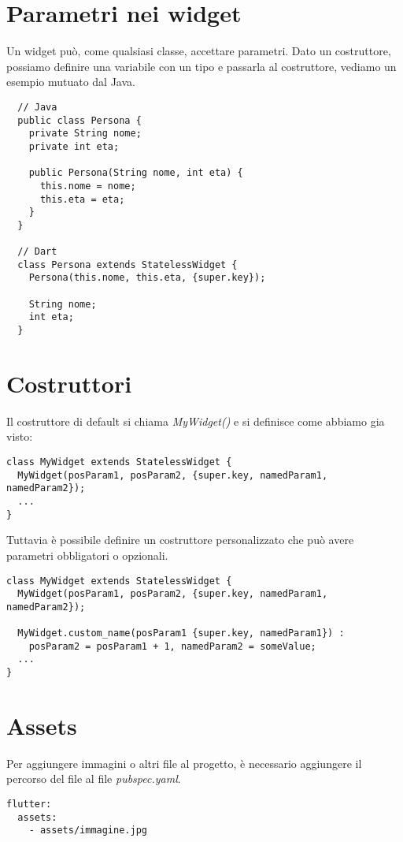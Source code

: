 \documentclass[12pt]{article}
\begin{document}
\section{Parametri nei widget}
Un widget può, come qualsiasi classe, accettare parametri.
Dato un costruttore, possiamo definire una variabile
con un tipo e passarla al costruttore, vediamo 
un esempio mutuato dal Java.

\begin{highlight}
\begin{verbatim}
  // Java
  public class Persona {
    private String nome;
    private int eta;

    public Persona(String nome, int eta) {
      this.nome = nome;
      this.eta = eta;
    }
  }

  // Dart
  class Persona extends StatelessWidget {
    Persona(this.nome, this.eta, {super.key});

    String nome;
    int eta;
  }
\end{verbatim}
\end{highlight}


\section{Costruttori}
Il costruttore di default si chiama \textit{MyWidget()}
e si definisce come abbiamo gia visto: 
\begin{highlight}
\begin{verbatim}
class MyWidget extends StatelessWidget {
  MyWidget(posParam1, posParam2, {super.key, namedParam1, namedParam2});
  ...
}
\end{verbatim}
\end{highlight}

Tuttavia è possibile definire un costruttore personalizzato
che può avere parametri obbligatori o opzionali.

\begin{highlight}
\begin{verbatim}
class MyWidget extends StatelessWidget {
  MyWidget(posParam1, posParam2, {super.key, namedParam1, namedParam2});

  MyWidget.custom_name(posParam1 {super.key, namedParam1}) : 
    posParam2 = posParam1 + 1, namedParam2 = someValue;
  ...
}
\end{verbatim}
\end{highlight}

\section{Assets}
Per aggiungere immagini o altri file al progetto, è necessario
aggiungere il percorso del file al file \textit{pubspec.yaml}.
\begin{highlight}
\begin{verbatim}
flutter:
  assets:
    - assets/immagine.jpg
\end{verbatim}
\end{highlight}
\end{document}
